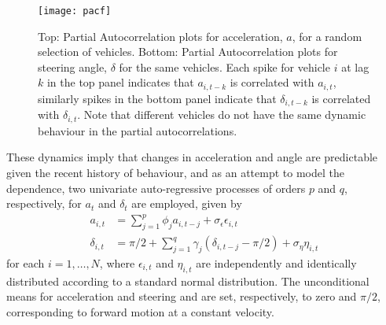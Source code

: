 \documentclass[12pt,a4paper]{article}\usepackage[]{graphicx}\usepackage[]{color}
\begin{document}
\begin{figure}
\centering
\texttt{[image: pacf]}
\caption{Top: Partial Autocorrelation plots for acceleration, $a$, for a random selection of vehicles. Bottom: Partial Autocorrelation plots for steering angle, $\delta$ for the same vehicles. Each spike for vehicle $i$ at lag $k$ in the top panel indicates that $a_{i, t-k}$ is correlated with $a_{i, t}$, similarly spikes in the bottom panel indicate that $\delta_{i, t-k}$ is correlated with $\delta_{i, t}$. Note that different vehicles do not have the same dynamic behaviour in the partial autocorrelations.}
\label{fig:pacf}
\end{figure}

These dynamics imply that changes in acceleration and angle are predictable given the recent history of behaviour, and as an attempt to model the dependence, two univariate auto-regressive processes of orders $p$ and $q$, respectively, for $a_t$ and $\delta_t$ are employed, given by
\begin{align}
a_{i, t} &= \sum_{j = 1}^p \phi_{j} a_{i, t-j} + \sigma_{\epsilon} \epsilon_{i, t} \label{aAR} \\
\delta_{i, t} &= \pi/2 + \sum_{j = 1}^q \gamma_{j} (\delta_{i, t-j} - \pi/2) + \sigma_{\eta} \eta_{i, t} \label{dAR}
\end{align}
for each $i = 1, \dots, N$, where $\epsilon_{i, t}$ and $\eta_{i, t}$ are independently and identically distributed according to a standard normal distribution. The unconditional means for acceleration and steering and are set, respectively, to zero and $\pi/2$, corresponding to forward motion at a constant velocity.
\\
\end{document}

